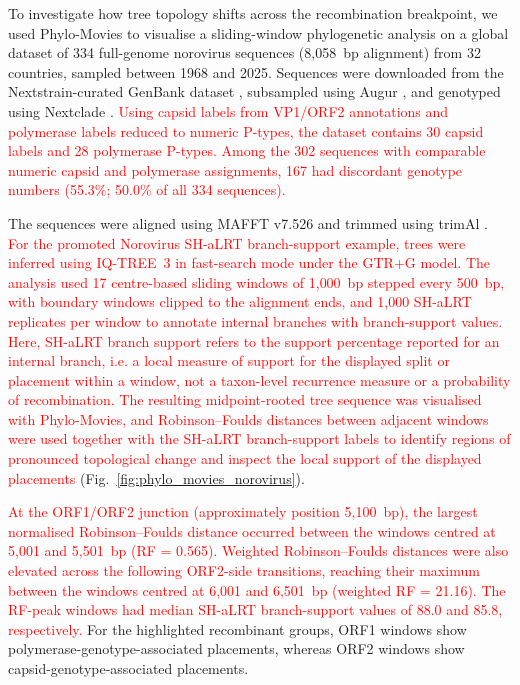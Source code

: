 To investigate how tree topology shifts across the recombination breakpoint, we used Phylo-Movies to visualise a sliding-window phylogenetic analysis on a global dataset of 334 full-genome norovirus sequences (8,058~bp alignment) from 32 countries, sampled between 1968 and 2025. Sequences were downloaded from the Nextstrain-curated GenBank dataset \citep{Hadfield2018}, subsampled using Augur \citep{Huddleston2021}, and genotyped using Nextclade \citep{Aksamentov2021}. \textcolor{red}{Using capsid labels from VP1/ORF2 annotations and polymerase labels reduced to numeric P-types, the dataset contains 30 capsid labels and 28 polymerase P-types. Among the 302 sequences with comparable numeric capsid and polymerase assignments, 167 had discordant genotype numbers (55.3\%; 50.0\% of all 334 sequences).}

The sequences were aligned using MAFFT v7.526 \citep{Katoh2013} and trimmed using trimAl \citep{CapellaGutierrez2009}. \textcolor{red}{For the promoted Norovirus SH-aLRT branch-support example, trees were inferred using IQ-TREE~3 \citep{Wong2026IQTREE3} in fast-search mode under the GTR+G model. The analysis used 17 centre-based sliding windows of 1{,}000~bp stepped every 500~bp, with boundary windows clipped to the alignment ends, and 1{,}000 SH-aLRT replicates per window to annotate internal branches with branch-support values. Here, SH-aLRT branch support refers to the support percentage reported for an internal branch, i.e. a local measure of support for the displayed split or placement within a window, not a taxon-level recurrence measure or a probability of recombination.}
\textcolor{red}{The resulting midpoint-rooted tree sequence was visualised with Phylo-Movies, and Robinson--Foulds distances between adjacent windows were used together with the SH-aLRT branch-support labels to identify regions of pronounced topological change and inspect the local support of the displayed placements} (Fig.~\ref{fig:phylo_movies_norovirus}).

\textcolor{red}{At the ORF1/ORF2 junction (approximately position 5,100~bp), the largest normalised Robinson--Foulds distance occurred between the windows centred at 5{,}001 and 5{,}501~bp (RF = 0.565). Weighted Robinson--Foulds distances were also elevated across the following ORF2-side transitions, reaching their maximum between the windows centred at 6{,}001 and 6{,}501~bp (weighted RF = 21.16). The RF-peak windows had median SH-aLRT branch-support values of 88.0 and 85.8, respectively.} For the highlighted recombinant groups, ORF1 windows show polymerase-genotype-associated placements, whereas ORF2 windows show capsid-genotype-associated placements.

